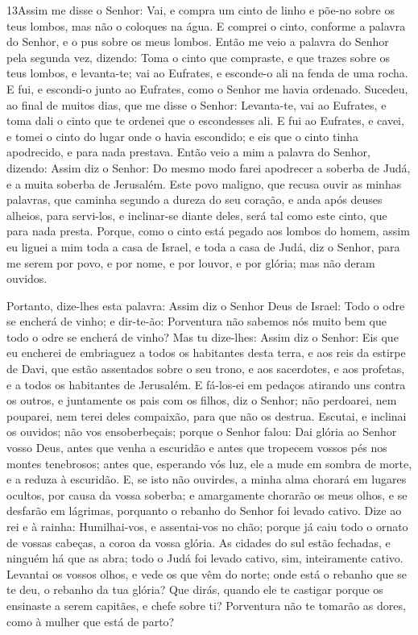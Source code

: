 \medskip

\lettrine{13} Assim me disse o Senhor: Vai, e compra um cinto
de linho e põe-no sobre os teus lombos, mas não o coloques na água.
E comprei o cinto, conforme a palavra do Senhor, e o pus sobre
os meus lombos. Então me veio a palavra do Senhor pela segunda
vez, dizendo: Toma o cinto que compraste, e que trazes sobre os
teus lombos, e levanta-te; vai ao Eufrates, e esconde-o ali na fenda
de uma rocha. E fui, e escondi-o junto ao Eufrates, como o
Senhor me havia ordenado. Sucedeu, ao final de muitos dias, que
me disse o Senhor: Levanta-te, vai ao Eufrates, e toma dali o cinto
que te ordenei que o escondesses ali. E fui ao Eufrates, e
cavei, e tomei o cinto do lugar onde o havia escondido; e eis que o
cinto tinha apodrecido, e para nada prestava. Então veio a mim a
palavra do Senhor, dizendo: Assim diz o Senhor: Do mesmo modo
farei apodrecer a soberba de Judá, e a muita soberba de Jerusalém.
Este povo maligno, que recusa ouvir as minhas palavras, que
caminha segundo a dureza do seu coração, e anda após deuses alheios,
para servi-los, e inclinar-se diante deles, será tal como este
cinto, que para nada presta. Porque, como o cinto está pegado
aos lombos do homem, assim eu liguei a mim toda a casa de Israel, e
toda a casa de Judá, diz o Senhor, para me serem por povo, e por
nome, e por louvor, e por glória; mas não deram ouvidos.

Portanto, dize-lhes esta palavra: Assim diz o Senhor Deus de
Israel: Todo o odre se encherá de vinho; e dir-te-ão: Porventura não
sabemos nós muito bem que todo o odre se encherá de vinho?
Mas tu dize-lhes: Assim diz o Senhor: Eis que eu encherei de
embriaguez a todos os habitantes desta terra, e aos reis da estirpe
de Davi, que estão assentados sobre o seu trono, e aos sacerdotes, e
aos profetas, e a todos os habitantes de Jerusalém. E
fá-los-ei em pedaços atirando uns contra os outros, e juntamente os
pais com os filhos, diz o Senhor; não perdoarei, nem pouparei, nem
terei deles compaixão, para que não os destrua. Escutai, e
inclinai os ouvidos; não vos ensoberbeçais; porque o Senhor falou:
Dai glória ao Senhor vosso Deus, antes que venha a escuridão
e antes que tropecem vossos pés nos montes tenebrosos; antes que,
esperando vós luz, ele a mude em sombra de morte, e a reduza à
escuridão. E, se isto não ouvirdes, a minha alma chorará em
lugares ocultos, por causa da vossa soberba; e amargamente chorarão
os meus olhos, e se desfarão em lágrimas, porquanto o rebanho do
Senhor foi levado cativo. Dize ao rei e à rainha:
Humilhai-vos, e assentai-vos no chão; porque já caiu todo o ornato
de vossas cabeças, a coroa da vossa glória. As cidades do sul
estão fechadas, e ninguém há que as abra; todo o Judá foi levado
cativo, sim, inteiramente cativo. Levantai os vossos olhos, e
vede os que vêm do norte; onde está o rebanho que se te deu, o
rebanho da tua glória? Que dirás, quando ele te castigar
porque os ensinaste a serem capitães, e chefe sobre ti? Porventura
não te tomarão as dores, como à mulher que está de parto?

